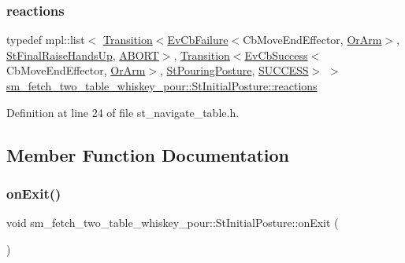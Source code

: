 \subsubsection{\texorpdfstring{reactions}{reactions}\hspace{0.1cm}{\footnotesize\ttfamily [2/2]}}
{\footnotesize\ttfamily typedef mpl\+::list$<$ \hyperlink{classsmacc_1_1Transition}{Transition}$<$\hyperlink{structsmacc_1_1EvCbFailure}{Ev\+Cb\+Failure}$<$Cb\+Move\+End\+Effector, \hyperlink{classsm__fetch__two__table__whiskey__pour_1_1OrArm}{Or\+Arm}$>$, \hyperlink{structsm__fetch__two__table__whiskey__pour_1_1StFinalRaiseHandsUp}{St\+Final\+Raise\+Hands\+Up}, \hyperlink{structsmacc_1_1default__transition__tags_1_1ABORT}{A\+B\+O\+RT}$>$, \hyperlink{classsmacc_1_1Transition}{Transition}$<$\hyperlink{structsmacc_1_1EvCbSuccess}{Ev\+Cb\+Success}$<$Cb\+Move\+End\+Effector, \hyperlink{classsm__fetch__two__table__whiskey__pour_1_1OrArm}{Or\+Arm}$>$, \hyperlink{structsm__fetch__two__table__whiskey__pour_1_1StPouringPosture}{St\+Pouring\+Posture}, \hyperlink{structsmacc_1_1default__transition__tags_1_1SUCCESS}{S\+U\+C\+C\+E\+SS}$>$ $>$ \hyperlink{structsm__fetch__two__table__whiskey__pour_1_1StInitialPosture_ab03c2d4761715a726806196990af59f9}{sm\+\_\+fetch\+\_\+two\+\_\+table\+\_\+whiskey\+\_\+pour\+::\+St\+Initial\+Posture\+::reactions}}



Definition at line 24 of file st\+\_\+navigate\+\_\+table.\+h.



\subsection{Member Function Documentation}
\mbox{\label{structsm__fetch__two__table__whiskey__pour_1_1StInitialPosture_a897a32b3c45edc11da22241828925ca4}} 
\subsubsection{\texorpdfstring{on\+Exit()}{onExit()}\hspace{0.1cm}{\footnotesize\ttfamily [1/2]}}
{\footnotesize\ttfamily void sm\+\_\+fetch\+\_\+two\+\_\+table\+\_\+whiskey\+\_\+pour\+::\+St\+Initial\+Posture\+::on\+Exit (\begin{DoxyParamCaption}{ }\end{DoxyParamCaption})\hspace{0.3cm}{\ttfamily [inline]}}



